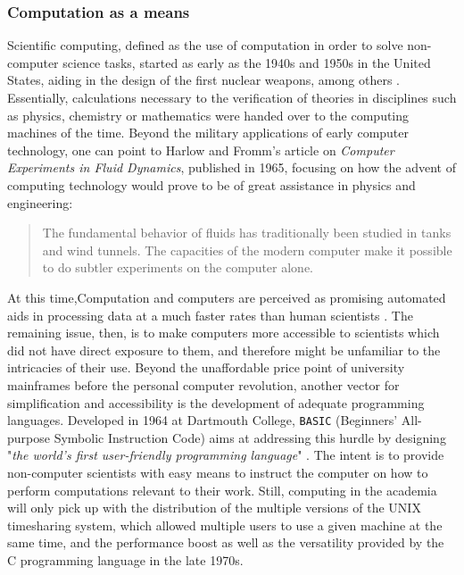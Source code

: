\subsubsection{Computation as a means}
\label{subsubsec:computation-means}

Scientific computing, defined as the use of computation in order to solve non-computer science tasks, started as early as the 1940s and 1950s in the United States, aiding in the design of the first nuclear weapons, among others \citep{oberkampf_verification_2010}. Essentially, calculations necessary to the verification of theories in disciplines such as physics, chemistry or mathematics were handed over to the computing machines of the time. Beyond the military applications of early computer technology, one can point to Harlow and Fromm's article on \emph{Computer Experiments in Fluid Dynamics}, published in 1965, focusing on how the advent of computing technology would prove to be of great assistance in physics and engineering:

\begin{quote}
  The fundamental behavior of fluids has traditionally been studied in tanks and wind tunnels. The capacities of the modern computer make it possible to do subtler experiments on the computer alone. \citep{harlow_computer_1965}
\end{quote}

At this time,Computation and computers are perceived as promising automated aids in processing data at a much faster rates than human scientists \citep{licklider_mancomputer_1960}. The remaining issue, then, is to make computers more accessible to scientists which did not have direct exposure to them, and therefore might be unfamiliar to the intricacies of their use. Beyond the unaffordable price point of university mainframes before the personal computer revolution, another vector for simplification and accessibility is the development of adequate programming languages. Developed in 1964 at Dartmouth College, \lstinline{BASIC} (Beginners' All-purpose Symbolic Instruction Code) aims at addressing this hurdle by designing "\emph{the world's first user-friendly programming language}" \citep{brooks_finally_2019}. The intent is to provide non-computer scientists with easy means to instruct the computer on how to perform computations relevant to their work. Still, computing in the academia will only pick up with the distribution of the multiple versions of the UNIX timesharing system, which allowed multiple users to use a given machine at the same time, and the performance boost as well as the versatility provided by the C programming language in the late 1970s.

